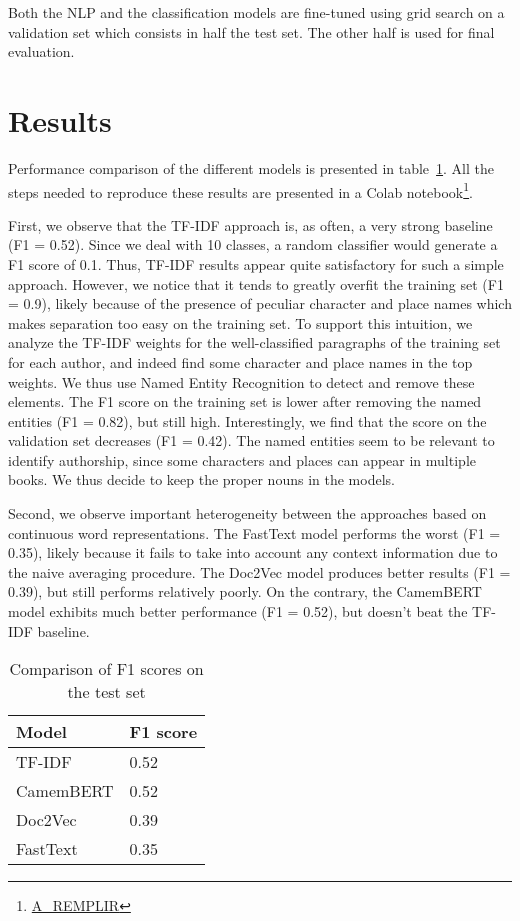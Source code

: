 \documentclass[11pt,a4paper]{article}
\begin{document}
Both the NLP and the classification models are fine-tuned using grid search on a validation set which consists in half the test set. The other half is used for final evaluation.

\section{Results}

Performance comparison of the different models is presented in table~\ref{compar}. All the steps needed to reproduce these results are presented in a Colab notebook\footnote{\url{A_REMPLIR}}. 

First, we observe that the TF-IDF approach is, as often, a very strong baseline (F1 = 0.52). Since we deal with 10 classes, a random classifier would generate a F1 score of 0.1. Thus, TF-IDF results appear quite satisfactory for such a simple approach.  However, we notice that it tends to greatly overfit the training set (F1 = 0.9), likely because of the presence of peculiar character and place names which makes separation too easy on the training set. To support this intuition, we analyze the TF-IDF weights for the well-classified paragraphs of the training set for each author, and indeed find some character and place names in the top weights. We thus use Named Entity Recognition to detect and remove these elements. The F1 score on the training set is lower after removing the named entities (F1 = 0.82), but still high. Interestingly, we find that the score on the validation set decreases (F1 = 0.42). The named entities seem to be relevant to identify authorship, since some characters and places can appear in multiple books. We thus decide to keep the proper nouns in the models.

Second, we observe important heterogeneity between the approaches based on continuous word representations. The FastText model performs the worst (F1 = 0.35), likely because it fails to take into account any context information due to the naive averaging procedure. The Doc2Vec model produces better results (F1 = 0.39), but still performs relatively poorly. On the contrary, the CamemBERT model exhibits much better performance (F1 = 0.52), but doesn't beat the TF-IDF baseline.



\begin{table}[]
\caption{Comparison of F1 scores on the test set}
\label{compar}
\begin{center}
\begin{tabular}{|l|l|}
\hline
\textbf{Model} & \textbf{F1 score} \\ \hline
TF-IDF         & 0.52              \\ \hline
CamemBERT       & 0.52                  \\ \hline
Doc2Vec        & 0.39                  \\ \hline
FastText      & 0.35                  \\ \hline
\end{tabular}
\end{center}
\end{table}
\end{document}
